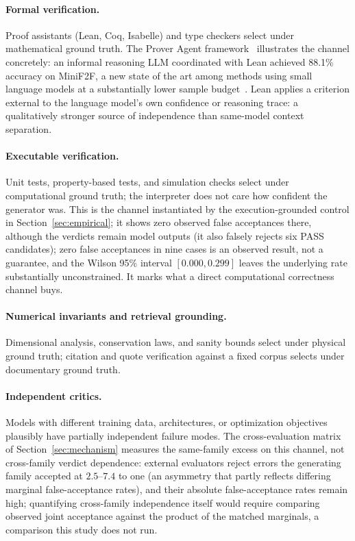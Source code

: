 \documentclass[a4paper,journal]{IAENGtran}
\begin{document}
\paragraph{Formal verification.} Proof assistants (Lean, Coq, Isabelle) and type
checkers select under mathematical ground truth. The Prover Agent
framework~\cite{baba2025prover} illustrates the channel concretely: an informal
reasoning LLM coordinated with Lean achieved 88.1\% accuracy on MiniF2F, a new
state of the art among methods using small language models at a substantially lower
sample budget~\cite{baba2025prover}.
Lean applies a criterion external to the language model's own confidence or reasoning
trace: a qualitatively stronger source of independence than same-model context
separation.

\paragraph{Executable verification.} Unit tests, property-based tests, and simulation
checks select under computational ground truth; the interpreter does not care how
confident the generator was. This is the channel instantiated by the execution-grounded
control in Section~\ref{sec:empirical}; it shows zero observed false acceptances there,
although the verdicts remain model outputs (it also falsely rejects six PASS
candidates); zero false acceptances in nine cases is an observed result, not a
guarantee, and the Wilson 95\% interval $[0.000,0.299]$ leaves the underlying rate
substantially unconstrained. It marks what a
direct computational correctness channel buys.

\paragraph{Numerical invariants and retrieval grounding.} Dimensional analysis,
conservation laws, and sanity bounds select under physical ground truth; citation and
quote verification against a fixed corpus selects under documentary ground truth.

\paragraph{Independent critics.} Models with different training data, architectures, or
optimization objectives plausibly have partially independent failure modes. The
cross-evaluation matrix of Section~\ref{sec:mechanism} measures the same-family excess
on this channel, not cross-family verdict dependence: external
evaluators reject errors the generating family accepted at $2.5$--$7.4$ to one (an
asymmetry that partly reflects differing marginal false-acceptance rates), and their
absolute false-acceptance rates remain high; quantifying cross-family independence
itself would require comparing observed joint acceptance against the product of the
matched marginals, a comparison this study does not run.
\end{document}
